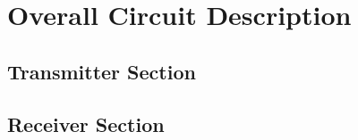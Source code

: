 \section{Overall Circuit Description}

\subsection{Transmitter Section}

\subsection{Receiver Section}
